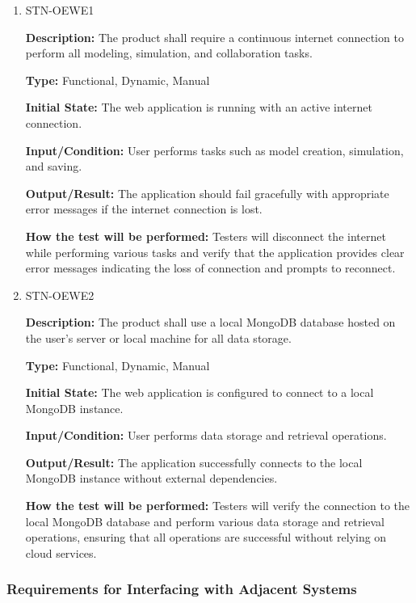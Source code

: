 \documentclass[12pt, titlepage]{article}
\begin{document}
\begin{enumerate}

\item{STN-OEWE1\\}

\textbf{Description:} The product shall require a continuous internet connection to perform all modeling, simulation, and collaboration tasks.

\textbf{Type:} Functional, Dynamic, Manual

\textbf{Initial State:} The web application is running with an active internet connection.

\textbf{Input/Condition:} User performs tasks such as model creation, simulation, and saving.

\textbf{Output/Result:} The application should fail gracefully with appropriate error messages if the internet connection is lost.

\textbf{How the test will be performed:} Testers will disconnect the internet while performing various tasks and verify that the application provides clear error messages indicating the loss of connection and prompts to reconnect.

\item{STN-OEWE2\\}

\textbf{Description:} The product shall use a local MongoDB database hosted on the user’s server or local machine for all data storage.

\textbf{Type:} Functional, Dynamic, Manual

\textbf{Initial State:} The web application is configured to connect to a local MongoDB instance.

\textbf{Input/Condition:} User performs data storage and retrieval operations.

\textbf{Output/Result:} The application successfully connects to the local MongoDB instance without external dependencies.

\textbf{How the test will be performed:} Testers will verify the connection to the local MongoDB database and perform various data storage and retrieval operations, ensuring that all operations are successful without relying on cloud services.

\end{enumerate}

\subsubsection{Requirements for Interfacing with Adjacent Systems}
\end{document}
